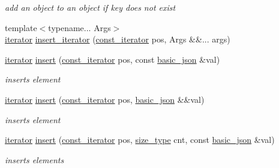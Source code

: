 \begin{DoxyCompactItemize}
\begin{DoxyCompactList}\small\item\em add an object to an object if key does not exist \end{DoxyCompactList}\item 
{\footnotesize template$<$typename... Args$>$ }\\\mbox{\hyperlink{classnlohmann_1_1basic__json_a099316232c76c034030a38faa6e34dca}{iterator}} \mbox{\hyperlink{classnlohmann_1_1basic__json_a316663487f1d20c0cf349b23f9494bda}{insert\+\_\+iterator}} (\mbox{\hyperlink{classnlohmann_1_1basic__json_a41a70cf9993951836d129bb1c2b3126a}{const\+\_\+iterator}} pos, Args \&\&... args)
\item 
\mbox{\hyperlink{classnlohmann_1_1basic__json_a099316232c76c034030a38faa6e34dca}{iterator}} \mbox{\hyperlink{classnlohmann_1_1basic__json_a0136728f5db69d4051c77b94307abd6c}{insert}} (\mbox{\hyperlink{classnlohmann_1_1basic__json_a41a70cf9993951836d129bb1c2b3126a}{const\+\_\+iterator}} pos, const \mbox{\hyperlink{classnlohmann_1_1basic__json}{basic\+\_\+json}} \&val)
\begin{DoxyCompactList}\small\item\em inserts element \end{DoxyCompactList}\item 
\mbox{\hyperlink{classnlohmann_1_1basic__json_a099316232c76c034030a38faa6e34dca}{iterator}} \mbox{\hyperlink{classnlohmann_1_1basic__json_a1ecce113ff11dd294689ee4d45cbb855}{insert}} (\mbox{\hyperlink{classnlohmann_1_1basic__json_a41a70cf9993951836d129bb1c2b3126a}{const\+\_\+iterator}} pos, \mbox{\hyperlink{classnlohmann_1_1basic__json}{basic\+\_\+json}} \&\&val)
\begin{DoxyCompactList}\small\item\em inserts element \end{DoxyCompactList}\item 
\mbox{\hyperlink{classnlohmann_1_1basic__json_a099316232c76c034030a38faa6e34dca}{iterator}} \mbox{\hyperlink{classnlohmann_1_1basic__json_a30a7cc24f2931c20ecae37ec4a5e901f}{insert}} (\mbox{\hyperlink{classnlohmann_1_1basic__json_a41a70cf9993951836d129bb1c2b3126a}{const\+\_\+iterator}} pos, \mbox{\hyperlink{classnlohmann_1_1basic__json_a39f2cd0b58106097e0e67bf185cc519b}{size\+\_\+type}} cnt, const \mbox{\hyperlink{classnlohmann_1_1basic__json}{basic\+\_\+json}} \&val)
\begin{DoxyCompactList}\small\item\em inserts elements \end{DoxyCompactList}\item 

\end{DoxyCompactItemize}

